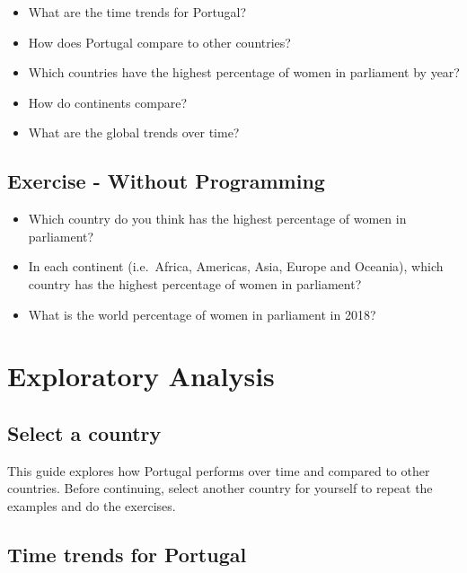 \documentclass[a4paper,9pt,twocolumn,twoside,]{pinp}
\providecommand{\tightlist}{%
  \setlength{\itemsep}{0pt}\setlength{\parskip}{0pt}}
\begin{document}
\begin{itemize}
\tightlist
\item
  What are the time trends for Portugal?
\item
  How does Portugal compare to other countries?
\item
  Which countries have the highest percentage of women in parliament by
  year?
\item
  How do continents compare?
\item
  What are the global trends over time?
\end{itemize}

\hypertarget{exercise---without-programming}{%
\subsection{Exercise - Without
Programming}\label{exercise---without-programming}}

\begin{itemize}
\tightlist
\item
  Which country do you think has the highest percentage of women in
  parliament?
\item
  In each continent (i.e.~Africa, Americas, Asia, Europe and Oceania),
  which country has the highest percentage of women in parliament?
\item
  What is the world percentage of women in parliament in 2018?
\end{itemize}

\hypertarget{exploratory-analysis}{%
\section{Exploratory Analysis}\label{exploratory-analysis}}

\hypertarget{select-a-country}{%
\subsection{Select a country}\label{select-a-country}}

This guide explores how Portugal performs over time and compared to
other countries. Before continuing, select another country for yourself
to repeat the examples and do the exercises.

\hypertarget{time-trends-for-portugal}{%
\subsection{Time trends for Portugal}\label{time-trends-for-portugal}}
\end{document}
